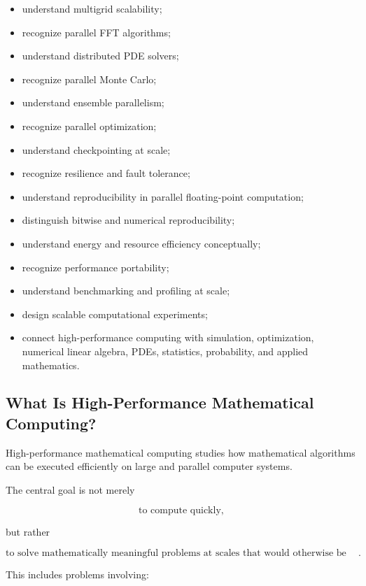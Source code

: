 {\begin{itemize}
    \item understand multigrid scalability;
    \item recognize parallel FFT algorithms;
    \item understand distributed PDE solvers;
    \item recognize parallel Monte Carlo;
    \item understand ensemble parallelism;
    \item recognize parallel optimization;
    \item understand checkpointing at scale;
    \item recognize resilience and fault tolerance;
    \item understand reproducibility in parallel floating-point
          computation;
    \item distinguish bitwise and numerical reproducibility;
    \item understand energy and resource efficiency conceptually;
    \item recognize performance portability;
    \item understand benchmarking and profiling at scale;
    \item design scalable computational experiments;
    \item connect high-performance computing with simulation,
          optimization, numerical linear algebra, PDEs, statistics,
          probability, and applied mathematics.
\end{itemize}
}

\subsection{What Is High-Performance Mathematical Computing?}
\label{subsec:what-is-hpmc}

High-performance mathematical computing studies how mathematical
algorithms can be executed efficiently on large and parallel computer
systems.

The central goal is not merely

\[
\boxed{
\text{to compute quickly},
}
\]

but rather

\[
\boxed{
\text{to solve mathematically meaningful problems at scales that would
otherwise be impractical}.
}
\]

This includes problems involving:

